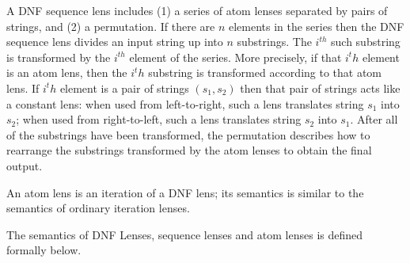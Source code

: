\documentclass[numbers,10pt,preprint\ifanon ,nocopyrightspace\fi]{sigplanconf}
\begin{document}
A DNF sequence lens includes (1) a series of atom lenses separated by pairs of 
strings, and (2) a permutation. If there are $n$ elements in the series then
the DNF sequence lens divides an input string up into $n$ substrings.
The $i^{th}$ such substring is transformed by the $i^{th}$ element of the series.
More precisely, if that $i^th$ element is an atom lens, then the  $i^th$
substring is transformed according to that atom lens.  If $i^th$ element
is a pair of strings $(s_1,s_2)$ then that pair of strings
acts like a constant lens: when used from left-to-right, such a lens 
translates string $s_1$ into $s_2$; when used from right-to-left, such a
lens translates string $s_2$ into $s_1$. 
After all of the substrings have been transformed,
the permutation describes how to rearrange the 
substrings transformed by the atom lenses to obtain the final output.

An atom lens is an iteration of a DNF lens; its semantics is similar to
the semantics of ordinary iteration lenses.

The semantics of DNF Lenses, sequence lenses and atom lenses 
is defined formally below.
\end{document}
